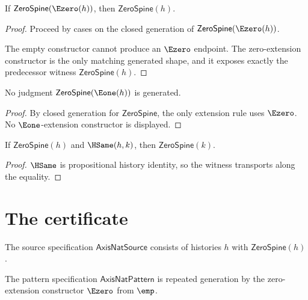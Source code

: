 \begin{lemma}
\label{lem:zero-spine-e0-inversion}
If $\mathsf{ZeroSpine}(\Ezero(h))$, then $\mathsf{ZeroSpine}(h)$.
\end{lemma}
\begin{proof}
Proceed by cases on the closed generation of $\mathsf{ZeroSpine}(\Ezero(h))$.

The empty constructor cannot produce an $\Ezero$ endpoint. The zero-extension constructor is the only matching generated shape, and it exposes exactly the predecessor witness $\mathsf{ZeroSpine}(h)$.
\end{proof}

\begin{lemma}
\label{lem:zero-spine-no-one-extension}
No judgment \(\mathsf{ZeroSpine}(\Eone(h))\) is generated.
\end{lemma}
\begin{proof}
By closed generation for \(\mathsf{ZeroSpine}\), the only extension rule uses \(\Ezero\). No \(\Eone\)-extension constructor is displayed.
\end{proof}

\begin{lemma}
\label{lem:zero-spine-hsame-transport}
If \(\mathsf{ZeroSpine}(h)\) and \(\HSame(h, k)\), then \(\mathsf{ZeroSpine}(k)\).
\end{lemma}
\begin{proof}
\(\HSame\) is propositional history identity, so the witness transports along the equality.
\end{proof}

\section{The certificate}

\begin{definition}
\label{def:axisnat-source-specification}
The source specification \(\mathsf{AxisNatSource}\) consists of histories \(h\) with \(\mathsf{ZeroSpine}(h)\).
\end{definition}

\begin{definition}
\label{def:axisnat-pattern-specification}
The pattern specification \(\mathsf{AxisNatPattern}\) is repeated generation by the zero-extension constructor \(\Ezero\) from \(\emp\).
\end{definition}

